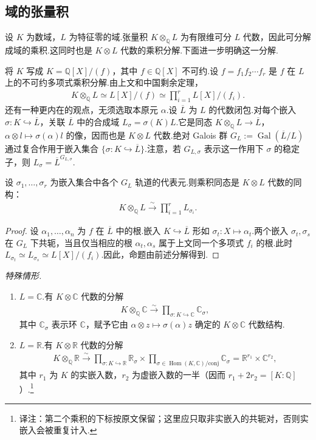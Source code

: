 \subsection{域的张量积}\label{sec:nt-2-1-6}
设 $K$ 为数域，$L$ 为特征零的域.张量积 $K\otimes_{\mathbb Q}L$ 为有限维可分 $L$ 代数，因此可分解成域的乘积.这同时也是 $K\otimes L$ 代数的乘积分解.下面进一步明确这一分解.

将 $K$ 写成 $K=\mathbb Q[X]/(f)$，其中 $f\in\mathbb Q[X]$ 不可约.设 $f=f_1f_2\cdots f_r$ 是 $f$ 在 $L$ 上的不可约多项式乘积分解.由上文和中国剩余定理，
\begin{align*}
K\otimes_{\mathbb Q}L\simeq L[X]/(f)\simeq\prod_{i=1}^rL[X]/(f_i).
\end{align*}
还有一种更内在的观点，无须选取本原元 $\alpha$.设 $\overline L$ 为 $L$ 的代数闭包.对每个嵌入 $\sigma:K\hookrightarrow\overline L$，关联 $\overline L$ 中的合成域 $L_\sigma=\sigma(K)L$.它是同态 $K\otimes_{\mathbb Q}L\longrightarrow\overline L$，$\alpha\otimes l\mapsto\sigma(\alpha)l$ 的像，因而也是 $K\otimes L$ 代数.绝对 Galois 群 $G_L:=\operatorname{Gal}(\overline L/L)$ 通过复合作用于嵌入集合 $\{\sigma:K\hookrightarrow\overline L\}$.注意，若 $G_{L,\sigma}$ 表示这一作用下 $\sigma$ 的稳定子，则 $L_\sigma=\overline L^{G_{L,\sigma}}$.
\begin{proposition*}
设 $\sigma_1,\ldots,\sigma_r$ 为嵌入集合中各个 $G_L$ 轨道的代表元.则乘积同态是 $K\otimes L$ 代数的同构：
\begin{align*}
K\otimes_{\mathbb Q}L\xrightarrow{\sim}\prod_{i=1}^rL_{\sigma_i}.
\end{align*}
\end{proposition*}
\begin{proof}
设 $\alpha_1,\ldots,\alpha_n$ 为 $f$ 在 $\overline L$ 中的根.嵌入 $K\hookrightarrow\overline L$ 形如 $\sigma_t:X\mapsto\alpha_t$.两个嵌入 $\sigma_t,\sigma_s$ 在 $G_L$ 下共轭，当且仅当相应的根 $\alpha_t,\alpha_s$ 属于上文同一个多项式 $f_i$ 的根.此时 $L_{\sigma_t}\simeq L_{\sigma_s}\simeq L[X]/(f_i)$.因此，命题由前述分解得到.
\end{proof}
\emph{特殊情形.}
\begin{enumerate}[label=\roman*)]
\item $L=\mathbb C$.有 $K\otimes\mathbb C$ 代数的分解
\begin{align*}
K\otimes_{\mathbb Q}\mathbb C\xrightarrow{\sim}\prod_{\sigma:K\hookrightarrow\mathbb C}\mathbb C_\sigma,
\end{align*}
其中 $\mathbb C_\sigma$ 表示环 $\mathbb C$，赋予它由 $\alpha\otimes z\mapsto\sigma(\alpha)z$ 确定的 $K\otimes\mathbb C$ 代数结构.
\item\label{item:nt-2-1-6-real} $L=\mathbb R$.有 $K\otimes\mathbb R$ 代数的分解
\begin{align*}
K\otimes_{\mathbb Q}\mathbb R\xrightarrow{\sim}
\prod_{\sigma:K\hookrightarrow\mathbb R}\mathbb R_\sigma\times
\prod_{\sigma\in\operatorname{Hom}(K,\mathbb C)/\mathrm{conj}}\mathbb C_\sigma
=\mathbb R^{r_1}\times\mathbb C^{r_2},
\end{align*}
其中 $r_1$ 为 $K$ 的实嵌入数，$r_2$ 为虚嵌入数的一半（因而 $r_1+2r_2=[K:\mathbb Q]$）.\footnote{译注：第二个乘积的下标按原文保留；这里应只取非实嵌入的共轭对，否则实嵌入会被重复计入.}
\end{enumerate}

